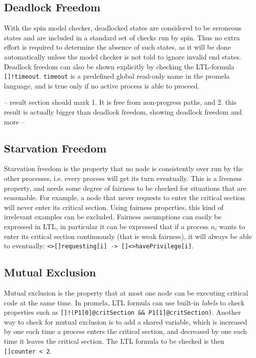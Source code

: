 \documentclass[a4paper,12pt]{article}
\begin{document}
\subsection{Deadlock Freedom}
With the spin model checker, deadlocked states are considered to be erroneous states and are included in a standard set of checks run by spin. Thus no extra effort is required to determine the absence of such states, as it will be done automatically unless the model checker is not told to ignore invalid end states. Deadlock freedom can also be shown explicitly by checking the LTL-formula \texttt{[]!timeout}. \texttt{timeout} is a predefined global read-only name in the promela language, and is true only if no active process is able to proceed.

-- result section should mark 1. It is free from non-progress paths, and 2. this result is actually bigger than deadlock freedom, showing deadlock freedom and more --

\subsection{Starvation Freedom}
Starvation freedom is the property that no node is consistently over run by the other processes, i.e. every process will get its turn eventually. This is a liveness property, and needs some degree of fairness to be checked for situations that are reasonable. For example, a node that never requests to enter the critical section will never enter its critical section. Using fairness properties, this kind of irrelevant examples can be excluded. Fairness assumptions can easily be expressed in LTL, in particular it can be expressed that if a process $n_i$ wants to enter its critical section continuously (that is weak fairness), it will always be able to eventually: \texttt{<>[]requesting[i] -> []<>havePrivilege[i]}.


\subsection{Mutual Exclusion}
Mutual exclusion is the property that at most one node can be executing critical code at the same time. In promela, LTL formula can use built-in \emph{labels} to check properties such as \texttt{[]!(P1[0]@critSection \&\& P1[1]@critSection)}. Another way to check for mutual exclusion is to add a shared variable, which is increased by one each time a process enters the critical section, and decreased by one each time it leaves the critical section. The LTL formula to be checked is then \texttt{[]counter < 2}.
\end{document}
